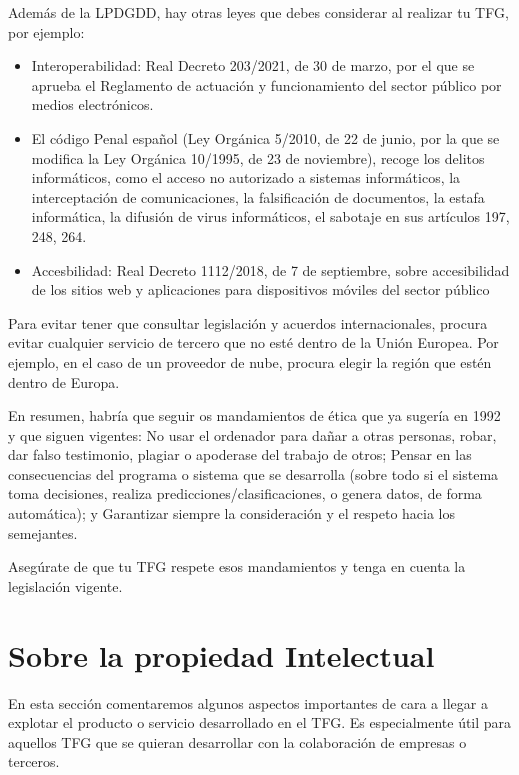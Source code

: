 Además de la LPDGDD, hay otras leyes que debes considerar al realizar tu TFG, por ejemplo:
 
\begin{itemize}
    \item Interoperabilidad: Real Decreto 203/2021, de 30 de marzo, por el que se aprueba el Reglamento de actuación y funcionamiento del sector público por medios electrónicos.
    \item El código Penal español (Ley Orgánica 5/2010, de 22 de junio, por la que se modifica la Ley Orgánica 10/1995, de 23 de noviembre), recoge los delitos informáticos, como el acceso no autorizado a sistemas informáticos, la interceptación de comunicaciones, la falsificación de documentos, la estafa informática, la difusión de virus informáticos, el sabotaje en sus artículos 197, 248, 264.
    \item Accesbilidad: Real Decreto 1112/2018, de 7 de septiembre, sobre accesibilidad de los sitios web y aplicaciones para dispositivos móviles del sector público
\end{itemize}

Para evitar tener que consultar legislación y acuerdos internacionales, procura evitar cualquier servicio de tercero que no esté dentro de la Unión Europea. Por ejemplo, en el caso de un proveedor de nube, procura elegir la región que estén dentro de Europa.

En resumen, habría que seguir os mandamientos de ética que ya sugería \cite{EticaUCM} en 1992 y que siguen vigentes: No usar el ordenador para dañar a otras personas, robar, dar falso testimonio, plagiar o apoderase del trabajo de otros; Pensar en las consecuencias del programa o sistema que se desarrolla (sobre todo si el sistema toma decisiones, realiza predicciones/clasificaciones, o genera datos, de forma automática); y Garantizar siempre la consideración y el respeto hacia los semejantes.

Asegúrate de que tu TFG respete esos mandamientos y tenga en cuenta la legislación vigente.

\section{Sobre la propiedad Intelectual} %

En esta sección comentaremos algunos aspectos importantes de cara a llegar a explotar el producto o servicio desarrollado en el TFG. Es especialmente útil para aquellos TFG que se quieran desarrollar con la colaboración de empresas o terceros.

